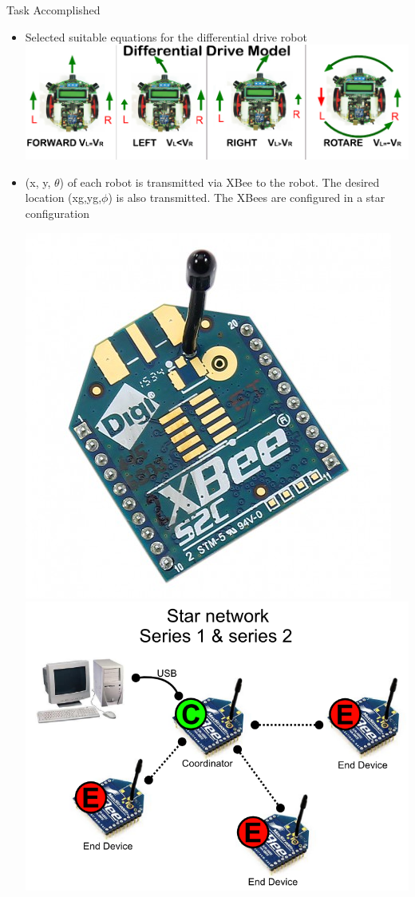 \documentclass[11pt, a4paper]{beamer}
\begin{document}
\begin{frame}{Task Accomplished}
\begin{itemize}

		\item Selected suitable equations for the differential drive robot\\
		\includegraphics[scale =.4]{images/ddrive.jpg}
		\item (x, y, $\theta$) of each robot is transmitted via XBee to the robot. The desired location (xg,yg,$\phi$) is also transmitted. The XBees are configured in a star configuration
		\\ \begin{center}
			\includegraphics[scale =.12]{images/xbee.jpg}
			\includegraphics[scale =.12]{images/star.png}

\end{center}
\end{itemize}
\end{frame}
\end{document}
